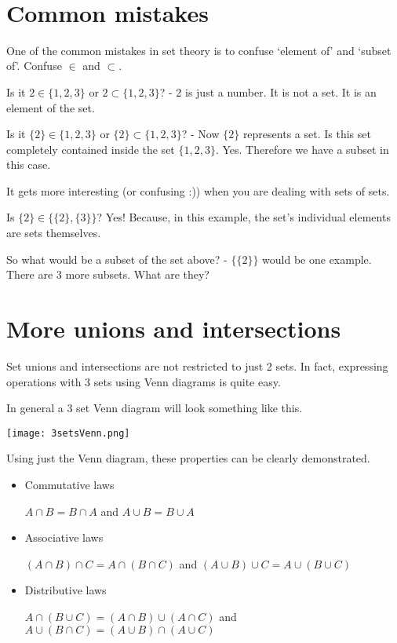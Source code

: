 \documentclass[12pt]{article}
\begin{document}
\begin{center}
\\
\vspace{1cm}
\end{center}


\medskip\noindent
	

\vspace{0.5cm}\noindent

\section*{Common mistakes}

One of the common mistakes in set theory is to confuse `element of' and `subset of'. Confuse $\in$ and $\subset$.

Is it $2 \in \{1,2,3\}$ or $2 \subset \{1,2,3\}$? - 2 is just a number. It is not a set. It is an element of the set.

Is it $\{2\} \in \{1,2,3\}$ or $\{2\} \subset \{1,2,3\}$? - Now $\{2\}$ represents a set. Is this set completely contained inside the set $\{1,2,3\}$. Yes. Therefore we have a subset in this case.

It gets more interesting (or confusing :)) when you are dealing with sets of sets.

Is $\{2\} \in \{\{2\},\{3\}\}$? Yes! Because, in this example, the set's individual elements are sets themselves.

So what would be a subset of the set above? - $\{\{2\}\}$ would be one example. There are 3 more subsets. What are they?

\section*{More unions and intersections}

Set unions and intersections are not restricted to just 2 sets. In fact, expressing operations with 3 sets using Venn diagrams is quite easy.

In general a 3 set Venn diagram will look something like this.

\texttt{[image: 3setsVenn.png]}

Using just the Venn diagram, these properties can be clearly demonstrated.

\begin{itemize}
\item Commutative laws

$A \cap B = B \cap A$ and $A \cup B = B \cup A$

\item Associative laws

$(A \cap B) \cap C = A \cap (B \cap C)$ and $(A \cup B) \cup C = A \cup (B \cup C)$

\item Distributive laws

$A \cap (B \cup C) = (A \cap B) \cup (A \cap C)$ and $A \cup (B \cap C) = (A \cup B) \cap (A \cup C)$
\end{itemize}
\end{document}
